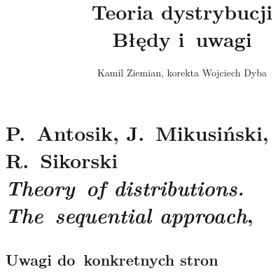 \documentclass[a4paper,11pt]{article}
\title{Teoria dystrybucji \\
  {\Large Błędy i~uwagi}}
\author{Kamil Ziemian, korekta Wojciech Dyba}
\numberwithin{equation}{section}
\begin{document}





\maketitle





\section{P.~Antosik, J.~Mikusiński, R.~Sikorski \\
  \textit{Theory~of distributions. The~sequential
    approach},
  \parencite{AntosikMikusinskiSikorskiTheoryOfDistributionsETC1973}}



\subsection{Uwagi do~konkretnych stron}

\label{subsec:AMS-Theory-ETC-Uwagi-do-konkrentych-stron}




\noindent
{}









\end{document}
